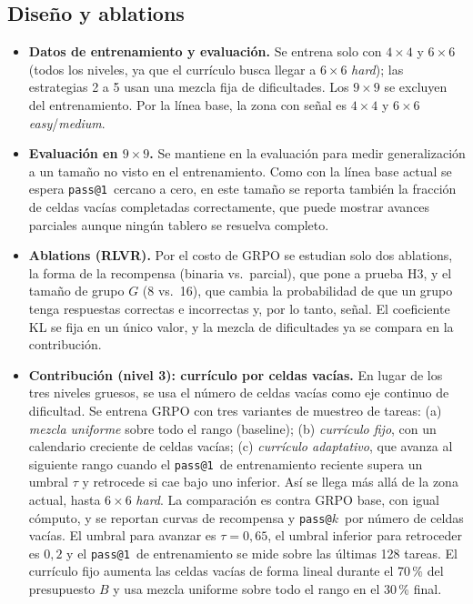 \documentclass[letterpaper,11pt]{article}
\makeatletter
\newcommand{\passuno}{\texttt{pass@1}}
\newcommand{\passk}{\texttt{pass@}\ensuremath{k}}
\makeatother
\begin{document}
\subsection{Diseño y ablations}
\begin{itemize}
  \item \textbf{Datos de entrenamiento y evaluación.} Se entrena solo con $4\times4$ y $6\times6$ (todos los niveles, ya que el currículo busca llegar a $6\times6$ \emph{hard}); las estrategias 2 a 5 usan una mezcla fija de dificultades. Los $9\times9$ se excluyen del entrenamiento. Por la línea base, la zona con señal es $4\times4$ y $6\times6$ \emph{easy}/\emph{medium}.
  \item \textbf{Evaluación en $9\times9$.} Se mantiene en la evaluación para medir generalización a un tamaño no visto en el entrenamiento. Como con la línea base actual se espera \passuno\ cercano a cero, en este tamaño se reporta también la fracción de celdas vacías completadas correctamente, que puede mostrar avances parciales aunque ningún tablero se resuelva completo.
  \item \textbf{Ablations (RLVR).} Por el costo de GRPO se estudian solo dos ablations, la forma de la recompensa (binaria vs.\ parcial), que pone a prueba H3, y el tamaño de grupo $G$ (8 vs.\ 16), que cambia la probabilidad de que un grupo tenga respuestas correctas e incorrectas y, por lo tanto, señal. El coeficiente KL se fija en un único valor, y la mezcla de dificultades ya se compara en la contribución.
  \item \textbf{Contribución (nivel 3): currículo por celdas vacías.} En lugar de los tres niveles gruesos, se usa el número de celdas vacías como eje continuo de dificultad. Se entrena GRPO con tres variantes de muestreo de tareas: (a) \emph{mezcla uniforme} sobre todo el rango (baseline); (b) \emph{currículo fijo}, con un calendario creciente de celdas vacías; (c) \emph{currículo adaptativo}, que avanza al siguiente rango cuando el \passuno\ de entrenamiento reciente supera un umbral $\tau$ y retrocede si cae bajo uno inferior. Así se llega más allá de la zona actual, hasta $6\times6$ \emph{hard}. La comparación es contra GRPO base, con igual cómputo, y se reportan curvas de recompensa y \passk\ por número de celdas vacías. El umbral para avanzar es $\tau=0{,}65$, el umbral inferior para retroceder es $0{,}2$ y el \passuno\ de entrenamiento se mide sobre las últimas 128 tareas. El currículo fijo aumenta las celdas vacías de forma lineal durante el 70\,\% del presupuesto $B$ y usa mezcla uniforme sobre todo el rango en el 30\,\% final.

\end{itemize}
\end{document}
